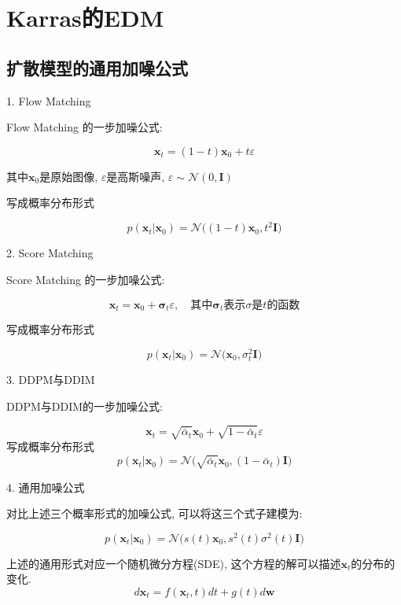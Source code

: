 \section{Karras的EDM}
\subsection{扩散模型的通用加噪公式}

1. Flow Matching

Flow Matching 的一步加噪公式:

$$
\mathbf{x}_{t}=(1-t)\mathbf{x}_{0}+t\varepsilon
$$

其中$\mathbf{x}_{0}$是原始图像, $\varepsilon$是高斯噪声, $\varepsilon \sim \mathcal{N}(0, \mathbf{I})$

写成概率分布形式

$$
p(\mathbf{x}_{t}|\mathbf{x}_{0}) = \mathcal{N}\bigg((1-t)\mathbf{x}_{0}, t^{2}\mathbf{I}\bigg)
$$

\hspace*{\fill}

2. Score Matching

Score Matching 的一步加噪公式:

$$
\mathbf{x}_{t}=\mathbf{x}_{0}+\mathbf{\sigma}_{t}\varepsilon, \quad \text{其中}\mathbf{\sigma}_{t}\text{表示}\sigma \text{是}t \text{的函数}
$$

写成概率分布形式

$$
p(\mathbf{x}_{t}|\mathbf{x}_{0}) = \mathcal{N}\bigg(\mathbf{x}_{0}, \sigma^{2}_{t}\mathbf{I}\bigg)
$$

\hspace*{\fill}

3. DDPM与DDIM

DDPM与DDIM的一步加噪公式:

$$
\mathbf{x}_{t}=\sqrt{\bar{\alpha}_{t}}\mathbf{x}_{0}+\sqrt{1-\bar{\alpha}_{t}} \varepsilon
$$
写成概率分布形式
$$
p(\mathbf{x}_{t}|\mathbf{x}_{0}) = \mathcal{N}\bigg(\sqrt{\bar{\alpha}_{t}}\mathbf{x}_{0}, (1-\bar{\alpha}_{t})\mathbf{I}\bigg)
$$

\hspace*{\fill}

4. 通用加噪公式

对比上述三个概率形式的加噪公式, 可以将这三个式子建模为:

$$
p(\mathbf{x}_{t}|\mathbf{x}_{0})=
\mathcal{N}\bigg(s(t)\mathbf{x}_{0}, s^{2}(t)\sigma^{2}(t)\mathbf{I}\bigg)
$$

上述的通用形式对应一个随机微分方程(SDE), 这个方程的解可以描述$\mathbf{x}_{t}$的分布的变化.
$$
d\mathbf{x}_{t}=f(\mathbf{x}_{t}, t)dt+g(t)d\mathbf{w}
$$

